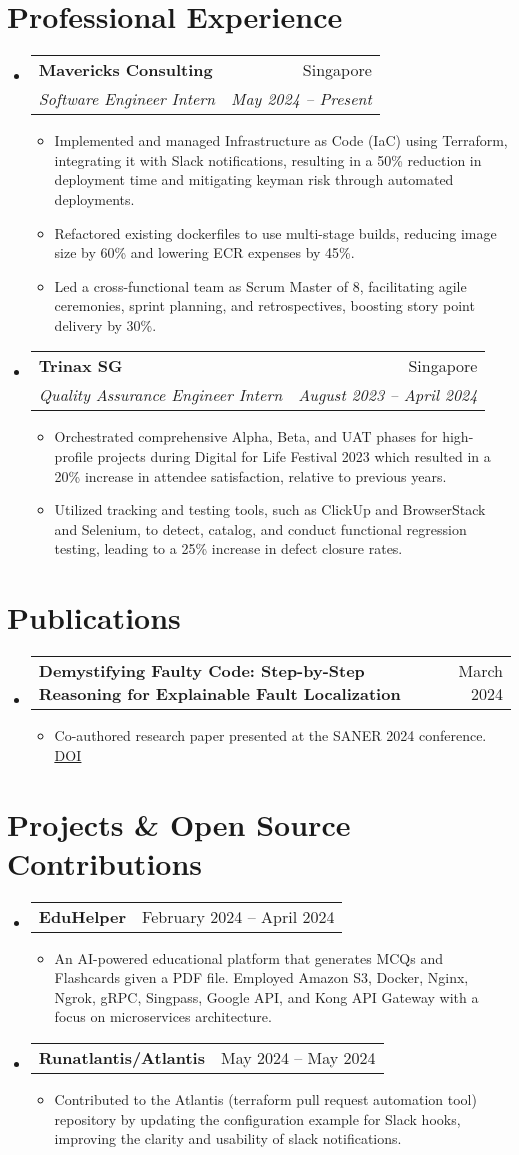 \documentclass[letterpaper,11pt]{article}
\makeatletter
\newcommand{\resumeItem}[1]{
  \item\small{
    {#1 \vspace{-2pt}}
  }
}
\newcommand{\resumeSubheading}[4]{
  \vspace{-2pt}\item
    \begin{tabular*}{0.97\textwidth}[t]{l@{\extracolsep{\fill}}r}
      \textbf{#1} & #2 \\
      \textit{\small#3} & \textit{\small #4} \\
    \end{tabular*}\vspace{-7pt}
}
\newcommand{\resumeProjectHeading}[2]{
    \item
    \begin{tabular*}{0.97\textwidth}{l@{\extracolsep{\fill}}r}
      \small#1 & #2 \\
    \end{tabular*}\vspace{-7pt}
}
\newcommand{\resumeSubHeadingListStart}{\begin{itemize}[leftmargin=0.15in, label={}]}
\newcommand{\resumeSubHeadingListEnd}{\end{itemize}}
\newcommand{\resumeItemListStart}{\begin{itemize}}
\newcommand{\resumeItemListEnd}{\end{itemize}\vspace{-5pt}}
\makeatother
\begin{document}
\section{Professional Experience}
  \resumeSubHeadingListStart
  \resumeSubheading
      {Mavericks Consulting}{Singapore }
      {Software Engineer Intern}{May 2024 -- Present}
      \resumeItemListStart
        \resumeItem{Implemented and managed Infrastructure as Code (IaC) using Terraform, integrating it with Slack notifications, resulting in a 50\% reduction in deployment time and mitigating keyman risk through automated deployments.}
        \resumeItem{Refactored existing dockerfiles to use multi-stage builds, reducing image size by 60\% and lowering ECR expenses by 45\%.}
 \resumeItem{Led a cross-functional team as Scrum Master of 8, facilitating agile ceremonies, sprint planning, and retrospectives, boosting story point delivery by 30\%. }
      \resumeItemListEnd
    \resumeSubheading
      {Trinax SG}{Singapore }
      {Quality Assurance Engineer Intern}{August 2023 -- April 2024}
      \resumeItemListStart
        \resumeItem{Orchestrated comprehensive Alpha, Beta, and UAT phases for high-profile projects during Digital for Life Festival 2023 which resulted in a 20\% increase in attendee satisfaction, relative to previous years.}
        \resumeItem{Utilized tracking and testing tools, such as ClickUp and BrowserStack and Selenium, to detect, catalog, and conduct functional regression testing, leading to a 25\% increase in defect closure rates.}
      \resumeItemListEnd
  \resumeSubHeadingListEnd

\section{Publications}
  \resumeSubHeadingListStart
    \resumeProjectHeading
      {\textbf{Demystifying Faulty Code: Step-by-Step Reasoning for Explainable Fault Localization}}{March 2024}
    \resumeItemListStart
      \resumeItem{Co-authored research paper presented at the SANER 2024 conference. \href{https://doi.org/10.48550/arXiv.2403.10507}{\underline{DOI}}}
    \resumeItemListEnd
  \resumeSubHeadingListEnd
      
\section{Projects \& Open Source Contributions}
  \resumeSubHeadingListStart
    \resumeProjectHeading
      {\textbf{EduHelper}}{February 2024 -- April 2024}
    \resumeItemListStart
      \resumeItem{An AI-powered educational platform that generates MCQs and Flashcards given a PDF file. Employed Amazon S3, Docker, Nginx, Ngrok, gRPC, Singpass, Google API, and Kong API Gateway with a focus on microservices architecture.}
    \resumeItemListEnd
    \resumeProjectHeading
      {\textbf{Runatlantis/Atlantis}}{May 2024 -- May 2024}
    \resumeItemListStart
      \resumeItem{Contributed to the Atlantis (terraform pull request automation tool) repository by updating the configuration example for Slack hooks, improving the clarity and usability of slack notifications.}
    \resumeItemListEnd
  \resumeSubHeadingListEnd
\end{document}
